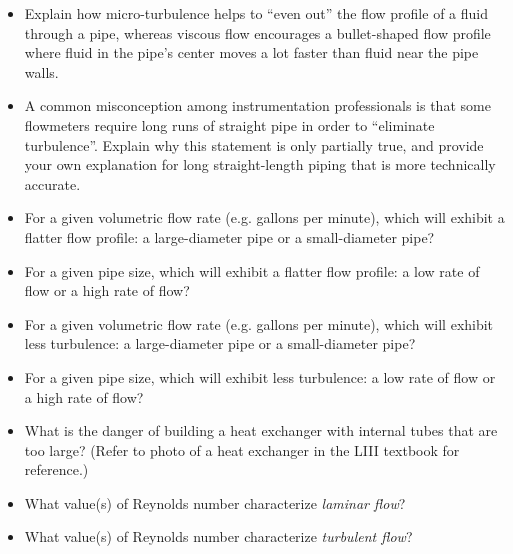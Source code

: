 \begin{itemize}
\item{} Explain how micro-turbulence helps to ``even out'' the flow profile of a fluid through a pipe, whereas viscous flow encourages a bullet-shaped flow profile where fluid in the pipe's center moves a lot faster than fluid near the pipe walls.
\item{} A common misconception among instrumentation professionals is that some flowmeters require long runs of straight pipe in order to ``eliminate turbulence''.  Explain why this statement is only partially true, and provide your own explanation for long straight-length piping that is more technically accurate.
\item{} For a given volumetric flow rate (e.g. gallons per minute), which will exhibit a flatter flow profile: a large-diameter pipe or a small-diameter pipe?
\item{} For a given pipe size, which will exhibit a flatter flow profile: a low rate of flow or a high rate of flow?
\item{} For a given volumetric flow rate (e.g. gallons per minute), which will exhibit less turbulence: a large-diameter pipe or a small-diameter pipe?
\item{} For a given pipe size, which will exhibit less turbulence: a low rate of flow or a high rate of flow?
\item{} What is the danger of building a heat exchanger with internal tubes that are too large?  (Refer to photo of a heat exchanger in the LIII textbook for reference.)
\item{} What value(s) of Reynolds number characterize {\it laminar flow}?
\item{} What value(s) of Reynolds number characterize {\it turbulent flow}?
\end{itemize}




